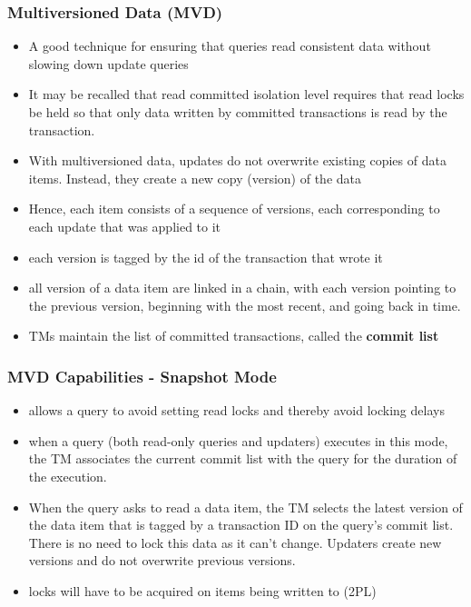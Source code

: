 \documentclass[12]{beamer}
\begin{document}
\begin{frame}
\frametitle{Multiversioned Data (MVD)}
\begin{itemize} 
\item A good technique for ensuring that queries read consistent data without slowing down update queries
\item It may be recalled that read committed isolation level requires that read locks be held so that only data written by committed transactions is read by the transaction.
\item With multiversioned data, updates do not overwrite existing copies of data items. Instead, they create a new copy (version) of the data
\item Hence, each item consists of a sequence of versions, each corresponding to each update that was applied to it
\item each version is tagged by the id of the transaction that wrote it
\item all version of a data item are linked in a chain, with each version pointing to the previous version, beginning with the most recent, and going back in time.
\item TMs maintain the list of committed transactions, called the \textbf{commit list}
\end{itemize}
\end{frame}

\begin{frame}
\frametitle{MVD Capabilities - Snapshot Mode}
\begin{itemize}
\item allows a query to avoid setting read locks and thereby avoid locking delays
\item when a query (both read-only queries and updaters) executes in this mode, the TM associates the current commit list with the query for the duration of the execution.
\item When the query asks to read a data item, the TM selects the latest version of the data item that is tagged by a transaction ID on the query's commit list. There is no need to lock this data as it can't change. Updaters create new versions and do not overwrite previous versions.
\item locks will have to be acquired on items being written to (2PL)
\end{itemize}
\end{frame}
\end{document}
